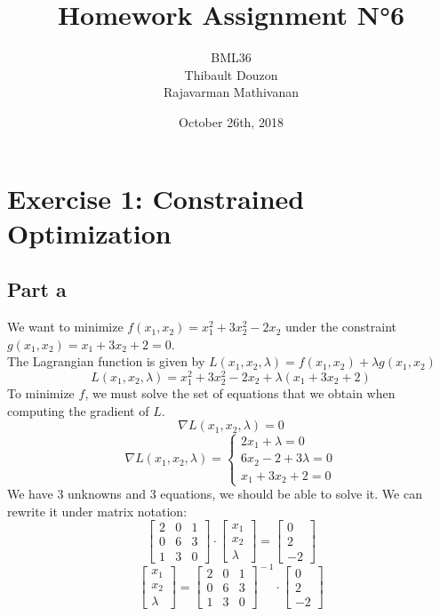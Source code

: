 \documentclass[a4paper, 10pt]{article}
\title{Homework Assignment N°6}
\author{BML36\\Thibault Douzon\\Rajavarman Mathivanan}
\date{October 26th, 2018}
\begin{document}
\maketitle

\pagebreak

\tableofcontents

\pagebreak
\section{Exercise 1: Constrained Optimization}
\subsection{Part a}
We want to minimize $f(x_1,x_2)= x_1^2+3x_2^2-2x_2$ under the constraint $g(x_1,x_2)=x_1+3x_2+2=0$.
\\
The Lagrangian function is given by $L(x_1,x_2,\lambda) = f(x_1,x_2)+\lambda g(x_1,x_2)$
$$
L(x_1,x_2,\lambda) = x_1^2+3x_2^2-2x_2 + \lambda (x_1+3x_2+2)
$$
To minimize $f$, we must solve the set of equations that we obtain when computing the gradient of $L$.
$$
\nabla L(x_1,x_2,\lambda) = 0
$$
$$
\nabla L(x_1,x_2,\lambda) = \left\{ \begin{array}{c}
    2x_1+\lambda = 0\\
    6x_2-2+3\lambda = 0\\
    x_1+3x_2+2=0
\end{array}\right. 
$$
We have 3 unknowns and 3 equations, we should be able to solve it. We can rewrite it under matrix notation:
$$
\begin{bmatrix}
    2 & 0 & 1\\
    0 & 6 & 3\\
    1 & 3 & 0
\end{bmatrix} \cdot \begin{bmatrix}
    x_1\\
    x_2\\
    \lambda
\end{bmatrix} = \begin{bmatrix}
    0\\
    2\\
    -2
\end{bmatrix}
$$
$$
\begin{bmatrix}
    x_1\\
    x_2\\
    \lambda
\end{bmatrix} =\begin{bmatrix}
    2 & 0 & 1\\
    0 & 6 & 3\\
    1 & 3 & 0
\end{bmatrix}^{\!-1} \cdot \begin{bmatrix}
    0\\
    2\\
    -2
\end{bmatrix}
$$
\end{document}
